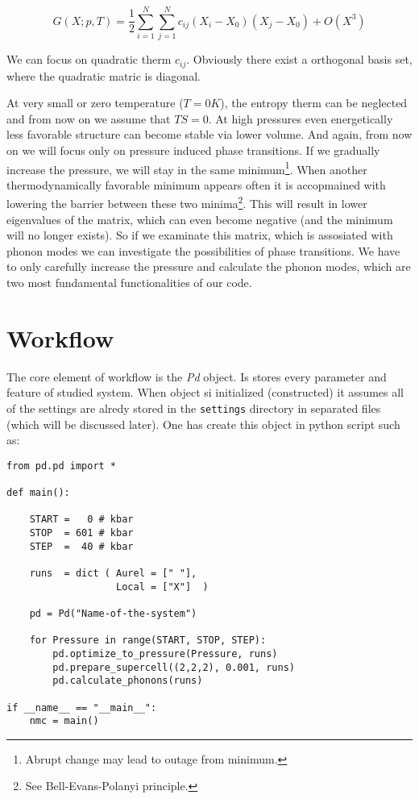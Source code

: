 \documentclass[12pt]{article}
\begin{document}
\begin{equation}
G(X; p, T) = \frac{1}{2}\sum_{i = 1}^N \sum_{j = 1}^N c_{ij} (X_i - X_0) (X_j - X_0) + O(X^3)
\end{equation}

We can focus on quadratic therm $c_{ij}$. Obviously there exist a orthogonal basis set, where the quadratic matric is diagonal. 

At very small or zero temperature ($T = 0K$), the entropy therm can be neglected and from now on we assume that $TS = 0$. At high pressures even energetically less favorable structure can become stable via lower volume. And again, from now on we will focus only on pressure induced phase transitions. If we gradually increase the pressure, we will stay in the same minimum\footnote{Abrupt change may lead to outage from minimum.}. When another thermodynamically favorable minimum appears often it is accopmained with lowering the barrier between these two minima\footnote{See Bell-Evans-Polanyi principle\cite{BEP}.}. This will result in lower eigenvalues of the matrix, which can even become negative (and the minimum will no longer exists). So if we examinate this matrix, which is assosiated with phonon modes we can investigate the possibilities of phase transitions. We have to only carefully increase the pressure and calculate the phonon modes, which are two most fundamental functionalities of our code.


\section{Workflow}

The core element of \pe workflow is the \textit{Pd} object. Is stores every parameter and feature of studied system. When object si initialized (constructed) it assumes all of the settings are alredy stored in the \texttt{settings} directory in separated files (which will be discussed later). One has create this object in python script such as:

\begin{verbatim}
from pd.pd import *

def main():

    START =   0 # kbar
    STOP  = 601 # kbar
    STEP  =  40 # kbar

    runs  = dict ( Aurel = [" "],
                   Local = ["X"]  )

    pd = Pd("Name-of-the-system")

    for Pressure in range(START, STOP, STEP):
        pd.optimize_to_pressure(Pressure, runs)
        pd.prepare_supercell((2,2,2), 0.001, runs)
        pd.calculate_phonons(runs)

if __name__ == "__main__":
    nmc = main()
\end{verbatim}
\end{document}
